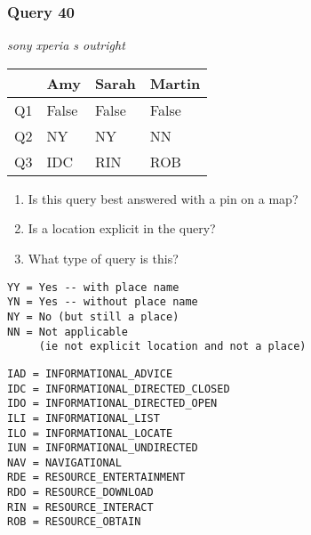 \begin{frame}[fragile]
\frametitle{Query 40}
\vspace{1em}

\emph{sony xperia s outright}

\vfill

\begin{table}
  \centering
  \begin{tabular}{ l l l l }
    & \textbf{Amy} & \textbf{Sarah} & \textbf{Martin}\\
    \toprule
    Q1 & False & False & False\\
Q2 & NY & NY & NN\\
Q3 & IDC & RIN & ROB\\
    \bottomrule
  \end{tabular}
\end{table}

\vfill

\tiny{

\begin{enumerate}
\item Is this query best answered with a pin on a map?
\item Is a location explicit in the query?
\item What type of query is this?
\end{enumerate}

\vfill

\begin{multicols}{2}
\begin{verbatim}
YY = Yes -- with place name
YN = Yes -- without place name
NY = No (but still a place)
NN = Not applicable 
     (ie not explicit location and not a place)
\end{verbatim}

\columnbreak
\begin{verbatim}
IAD = INFORMATIONAL_ADVICE
IDC = INFORMATIONAL_DIRECTED_CLOSED
IDO = INFORMATIONAL_DIRECTED_OPEN
ILI = INFORMATIONAL_LIST
ILO = INFORMATIONAL_LOCATE
IUN = INFORMATIONAL_UNDIRECTED
NAV = NAVIGATIONAL
RDE = RESOURCE_ENTERTAINMENT
RDO = RESOURCE_DOWNLOAD
RIN = RESOURCE_INTERACT
ROB = RESOURCE_OBTAIN
\end{verbatim}
\end{multicols}
}

\end{frame}


